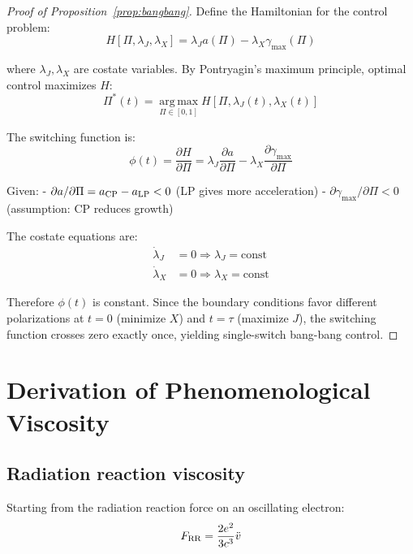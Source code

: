 \documentclass[aps,pre,twocolumn,showpacs,superscriptaddress]{revtex4-2}
\theoremstyle{definition}
\newcommand{\Argmax}{\operatorname*{arg\,max}}
\begin{document}
\begin{proof}[Proof of Proposition~\ref{prop:bangbang}]
Define the Hamiltonian for the control problem:
\begin{equation}
H[\Pi,\lambda_J,\lambda_X] = \lambda_J a(\Pi) - \lambda_X \gamma_{\max}(\Pi)
\end{equation}

where $\lambda_J, \lambda_X$ are costate variables. By Pontryagin's maximum principle, optimal control maximizes $H$:
\begin{equation}
\Pi^*(t) = \Argmax_{\Pi \in [0,1]} H[\Pi,\lambda_J(t),\lambda_X(t)]
\end{equation}

The switching function is:
\begin{equation}
\phi(t) = \frac{\partial H}{\partial \Pi} = \lambda_J \frac{\partial a}{\partial \Pi} - \lambda_X \frac{\partial \gamma_{\max}}{\partial \Pi}
\end{equation}

Given:
- $\partial a/\partial \Pi = a_{\rm CP} - a_{\rm LP} < 0$ (LP gives more acceleration)
- $\partial \gamma_{\max}/\partial \Pi < 0$ (assumption: CP reduces growth)

The costate equations are:
\begin{align}
\dot{\lambda}_J &= 0 \Rightarrow \lambda_J = \text{const} \\
\dot{\lambda}_X &= 0 \Rightarrow \lambda_X = \text{const}
\end{align}

Therefore $\phi(t)$ is constant. Since the boundary conditions favor different polarizations at $t=0$ (minimize $X$) and $t=\tau$ (maximize $J$), the switching function crosses zero exactly once, yielding single-switch bang-bang control.
\end{proof}

\section{Derivation of Phenomenological Viscosity}

\subsection{Radiation reaction viscosity}

Starting from the radiation reaction force on an oscillating electron:
\begin{equation}
F_{\rm RR} = \frac{2e^2}{3c^3}\ddot{v}
\end{equation}
\end{document}
